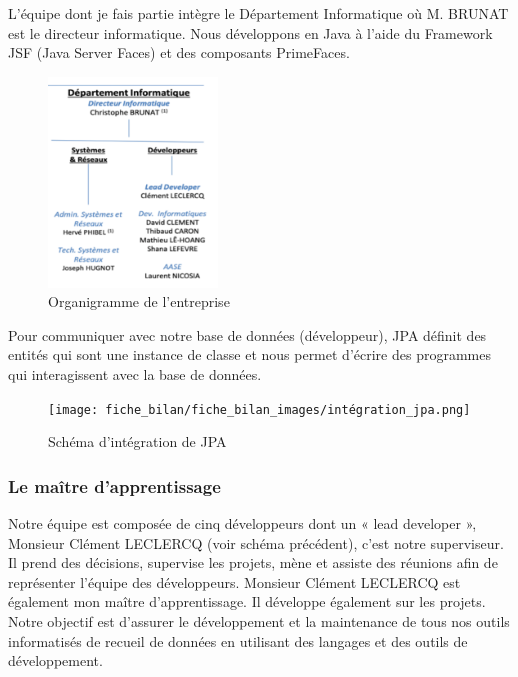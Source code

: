 L’équipe dont je fais partie intègre le Département Informatique où M. BRUNAT est le directeur informatique.
Nous développons en Java à l’aide du Framework JSF (Java Server Faces) et
des composants PrimeFaces.
\begin{figure}[H]
    \centering
    \includegraphics[width=0.4\textwidth]{fiche_bilan/fiche_bilan_images/organigramme_info.png} 
    \caption{Organigramme de l'entreprise}
\end{figure}
Pour communiquer avec notre base de données (développeur), JPA définit des
entités qui sont une instance de classe et nous permet d’écrire des
programmes qui interagissent avec la base de données.
\begin{figure}[H]
    \centering
    \texttt{[image: fiche\_bilan/fiche\_bilan\_images/intégration\_jpa.png]} 
    \caption{Schéma d'intégration de JPA}
\end{figure}

\subsubsection{Le maître d'apprentissage}
Notre équipe est composée de cinq développeurs dont un « lead developer »,
Monsieur Clément LECLERCQ (voir schéma précédent), c’est notre superviseur. Il prend des décisions, supervise les projets, mène et assiste des réunions afin de représenter l'équipe des développeurs. Monsieur Clément LECLERCQ est également mon maître d’apprentissage. Il développe également sur les projets.
Notre objectif est d’assurer le développement et la maintenance de tous nos outils informatisés de recueil de données en utilisant des langages et des outils
de développement.
